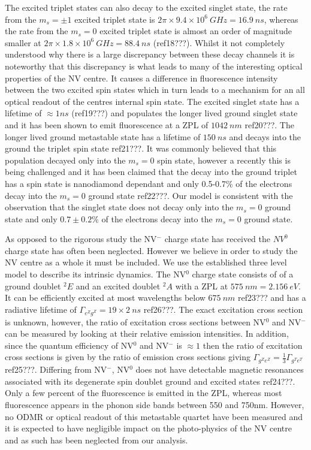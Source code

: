 \documentclass[prl]{revtex4}
\begin{document}
The excited triplet states can also decay to the excited singlet state, the rate from the $m_s=\pm1$ excited triplet state is $2\pi\times9.4\times10^6\SI{}{GHz} = \SI{16.9}{ns}$, whereas the rate from the $m_s=0$ excited triplet state is almost an order of magnitude smaller at $ 2\pi\times1.8\times10^6 \SI{}{GHz} = \SI{88.4}{ns}$ (ref18???). Whilst it not completely understood why there is a large discrepancy between these decay channels it is noteworthy that this discrepancy is what leads to many of the interesting optical properties of the NV centre. It causes a difference in fluorescence intensity between the two excited spin states which in turn leads to a mechanism for an all optical readout of the centres internal spin state. The excited singlet state has a lifetime of $\approx\si{1}{ns}$ (ref19???) and populates the longer lived ground singlet state and it has been shown to emit fluorescence at a ZPL of $\SI{1042}{nm}$ ref20???. The longer lived ground metastable state has a lifetime of $\SI{150}{ns}$ and decays into the ground the triplet spin state ref21???. It was commonly believed that this population decayed only into the $m_s=0$ spin state, however a recently this is being challenged and it has been claimed that the decay into the ground triplet has a spin state is nanodiamond dependant and only 0.5-0.7\% of the electrons decay into the $m_s=0$ ground state ref22???. Our model is consistent with the observation that the singlet state does not decay only into the $m_s=0$ ground state and only $0.7 \pm 0.2\%$ of the electrons decay into the $m_s=0$ ground state.

As opposed to the rigorous study the NV$^-$ charge state has received the $NV^0$ charge state has often been neglected. However we believe in order to study the NV centre as a whole it must be included. We use the established three level model to describe its intrinsic dynamics. The NV$^0$ charge state consists of of a ground doublet $^2E$ and an excited doublet $^2A$ with a ZPL at $\SI{575}{nm} = \SI{2.156}{eV}$.  It can be efficiently excited at most wavelengths below $\SI{675}{nm}$ ref23??? and has a radiative lifetime of $\Gamma_{e^Zg^Z} = 19\times2 \SI{}{ns}$ ref26???. The exact excitation cross section is unknown, however, the ratio of excitation cross sections between NV$^0$ and NV$^-$ can be measured by looking at their relative emission intensities. In addition, since the quantum efficiency of NV$^0$ and NV$^-$ is $\approx 1$ then the ratio of excitation cross sections is given by the ratio of emission cross sections giving $\Gamma_{g^Ze^Z} = \frac{1}{3} \Gamma_{g^Te^T}$ ref25???. Differing from NV$^-$, NV$^0$ does not have detectable magnetic resonances associated with its degenerate spin doublet ground and excited states ref24???. Only a few percent of the fluorescence is emitted in the ZPL, whereas most fluorescence appears in the phonon side bands between 550 and 750nm. However, no ODMR or optical readout of this metastable quartet have been measured and it is expected to have negligible impact on the photo-physics of the NV centre and as such has been neglected from our analysis. 
\end{document}
